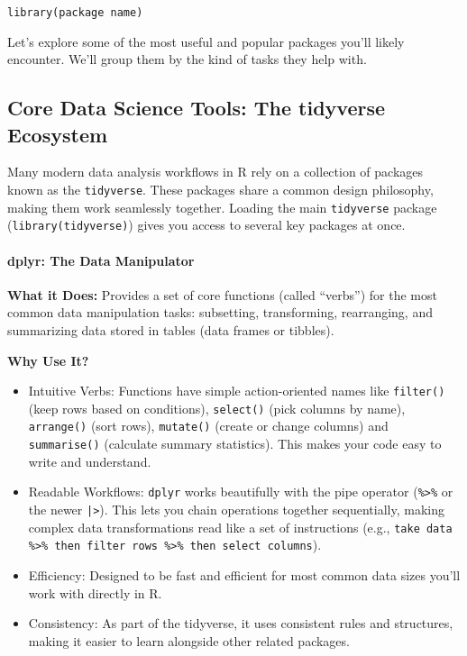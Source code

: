 \begin{verbatim}
library(package name)
\end{verbatim}

Let’s explore some of the most useful and popular packages you’ll likely encounter. We’ll group them by the kind of tasks they help with.

\subsection{Core Data Science Tools: The tidyverse Ecosystem}

Many modern data analysis workflows in R rely on a collection of packages known as the \texttt{tidyverse}. These packages share a common design philosophy, making them work seamlessly together. Loading the main \texttt{tidyverse} package (\texttt{library(tidyverse)}) gives you access to several key packages at once.

\paragraph{dplyr: The Data Manipulator}

\textbf{What it Does:} Provides a set of core functions (called “verbs”) for the most common data manipulation tasks: subsetting, transforming, rearranging, and summarizing data stored in tables (data frames or tibbles).

\textbf{Why Use It?}
\begin{itemize}
    \item Intuitive Verbs: Functions have simple action-oriented names like \texttt{filter()} (keep rows based on conditions), \texttt{select()} (pick columns by name), \texttt{arrange()} (sort rows), \texttt{mutate()} (create or change columns) and \texttt{summarise()} (calculate summary statistics). This makes your code easy to write and understand.
    \item Readable Workflows: \texttt{dplyr} works beautifully with the pipe operator (\texttt{\%\textgreater\%} or the newer \texttt{|>}). This lets you chain operations together sequentially, making complex data transformations read like a set of instructions (e.g., \texttt{take data \%\textgreater\% then filter rows \%\textgreater\% then select columns}).
    \item Efficiency: Designed to be fast and efficient for most common data sizes you’ll work with directly in R.
    \item Consistency: As part of the tidyverse, it uses consistent rules and structures, making it easier to learn alongside other related packages.
\end{itemize}


